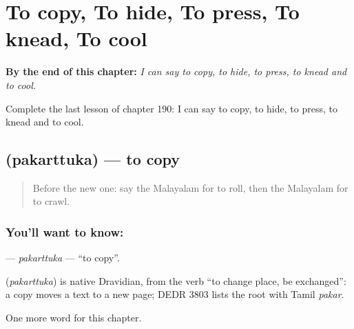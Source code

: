
\chapter{To copy, To hide, To press, To knead, To cool}
\label{ch:ml-to-copy-to-hide-to-press-to-knead-to-cool}

\begin{chapteropening}
\textbf{By the end of this chapter:} \emph{I can say to copy, to hide, to press, to knead and to cool.}

Complete the last lesson of chapter 190: I can say to copy, to hide, to press, to knead and to cool.
\end{chapteropening}

\section[\texorpdfstring{\ml{പകർത്തുക} (pakarttuka)}{പകർത്തുക (pakarttuka)}]{ (pakarttuka) — to copy}

\label{lesson:ML-C190-pakarttuka}



\begin{quote}
Before the new one: say the Malayalam for to roll, then the Malayalam for to crawl.
\end{quote}

\subsection*{You'll want to know: }
\textbf{} — \emph{pakarttuka} — \textquotedblleft{}to copy\textquotedblright{}.

\begin{cousinweb}
\textbf{} (\emph{pakarttuka}) is native Dravidian, from the verb \textquotedblleft{}to change place, be exchanged\textquotedblright{}: a copy moves a text to a new page; DEDR 3803 lists the root with Tamil \emph{pakar}.
\end{cousinweb}

\begin{grammarlens}[title={What you've built}]
One more word for this chapter.
\end{grammarlens}


